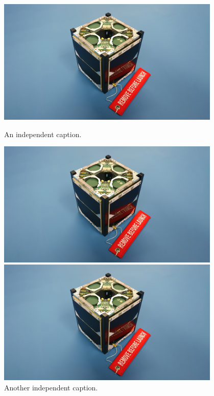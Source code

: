 \begin{figure}[!htb]
    \centering
    \begin{minipage}{.2\linewidth}
        \centering
        \includegraphics[width=0.95\textwidth]{images/istsat1.jpeg}
        \caption{An independent caption.}
		\label{fig:four_in_row_1}
    \end{minipage}
    \begin{minipage}{.2\linewidth}
        \centering
        \includegraphics[width=0.95\textwidth]{images/istsat1.jpeg}
        \caption{Another independent caption.}
		\label{fig:four_in_row_2}
    \end{minipage}
	\begin{minipage}{.2\linewidth}
        \centering
        \includegraphics[width=0.95\textwidth]{images/istsat1.jpeg}

\end{minipage}
\end{figure}

